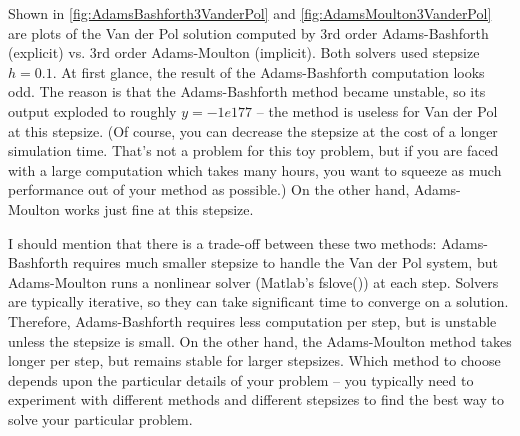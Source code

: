 \documentclass[hidelinks,notitlepage]{book}
\begin{document}
Shown in \cref{fig:AdamsBashforth3VanderPol} and \cref{fig:AdamsMoulton3VanderPol} are plots of the Van der Pol solution computed by 3rd order Adams-Bashforth (explicit) vs. 3rd order Adams-Moulton (implicit).  Both solvers used stepsize $h = 0.1$.  At first glance, the result of the Adams-Bashforth computation looks odd.  The reason is that the Adams-Bashforth method became unstable, so its output exploded to roughly $y = -1e177$ -- the method is useless for Van der Pol at this stepsize.  (Of course, you can decrease the stepsize at the cost of a longer simulation time.  That's not a problem for this toy problem, but if you are faced with a large computation which takes many hours, you want to squeeze as much performance out of your method as possible.)  On the other hand, Adams-Moulton works just fine at this stepsize.  

I should mention that there is a trade-off between these two methods:  Adams-Bashforth requires much smaller stepsize to handle the Van der Pol system, but Adams-Moulton runs a nonlinear solver (Matlab's fslove()) at each step.  Solvers are typically iterative, so they can take significant time to converge on a solution.  Therefore, Adams-Bashforth requires less computation per step, but is unstable unless the stepsize is small.  On the other hand, the Adams-Moulton method takes longer per step, but remains stable for larger stepsizes.  Which method to choose depends upon the particular details of your problem -- you typically need to experiment with different methods and different stepsizes to find the best way to solve your particular problem.
\end{document}
